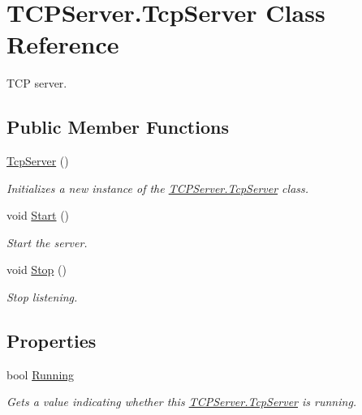 \hypertarget{classTCPServer_1_1TcpServer}{}\section{T\+C\+P\+Server.\+Tcp\+Server Class Reference}
\label{classTCPServer_1_1TcpServer}


T\+C\+P server.  


\subsection*{Public Member Functions}
\begin{DoxyCompactItemize}
\item 
\hyperlink{classTCPServer_1_1TcpServer_a4444c2ee5cea05a9cc51dfbf13346bcb}{Tcp\+Server} ()
\begin{DoxyCompactList}\small\item\em Initializes a new instance of the \hyperlink{classTCPServer_1_1TcpServer}{T\+C\+P\+Server.\+Tcp\+Server} class. \end{DoxyCompactList}\item 
void \hyperlink{classTCPServer_1_1TcpServer_a07f6d4f63dc650fb16b1d04238530d84}{Start} ()
\begin{DoxyCompactList}\small\item\em Start the server. \end{DoxyCompactList}\item 
void \hyperlink{classTCPServer_1_1TcpServer_ad0473419ab67e1933960e25a9d68d432}{Stop} ()
\begin{DoxyCompactList}\small\item\em Stop listening. \end{DoxyCompactList}\end{DoxyCompactItemize}
\subsection*{Properties}
\begin{DoxyCompactItemize}
\item 
bool \hyperlink{classTCPServer_1_1TcpServer_a8cb98bcaee0f02a0fe4163d99d5cc124}{Running}
\begin{DoxyCompactList}\small\item\em Gets a value indicating whether this \hyperlink{classTCPServer_1_1TcpServer}{T\+C\+P\+Server.\+Tcp\+Server} is running. \end{DoxyCompactList}\end{DoxyCompactItemize}


